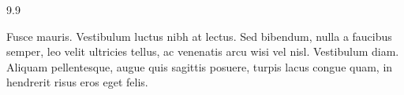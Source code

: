\begin{problemlist}{9.9}
\item\label{ch01:prob3.16} Fusce mauris. Vestibulum luctus nibh at lectus. Sed bibendum, nulla a faucibus semper, leo velit
ultricies tellus, ac venenatis arcu wisi vel nisl. Vestibulum diam. Aliquam pellentesque, augue quis
sagittis posuere, turpis lacus congue quam, in hendrerit risus eros eget felis.
\end{problemlist}
